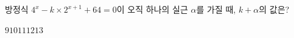 방정식 $4^x-k\times 2^{x+1}+64=0$이 오직 하나의 실근 $\alpha$를 가질 때, $k+\alpha$의 값은? 
\begin{choices32}{$9$}{$10$}{$11$}{$12$}{$13$}\end{choices32}
